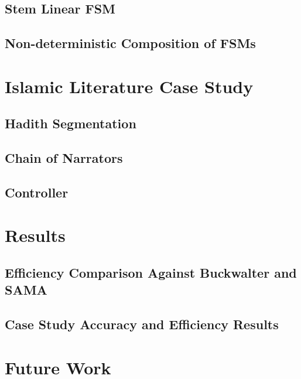 \documentclass[11pt,letterpaper]{article}
\begin{document}
\subsection{Stem Linear FSM}

\subsection{Non-deterministic Composition of FSMs}

\section{Islamic Literature Case Study}

\subsection{Hadith Segmentation}

\subsection{Chain of Narrators} 

\subsection{Controller}


\section{Results}
\label{sec:results}

\subsection{Efficiency Comparison Against Buckwalter and SAMA}

\subsection{Case Study Accuracy and Efficiency Results}


\section{Future Work}
\end{document}
